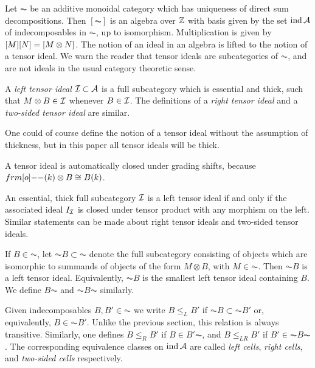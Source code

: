 Let $\AC$ be an additive monoidal category which has uniqueness of direct sum decompositions. Then $[\AC]$ is an algebra over ${\mathbb{Z}}$ with basis given by the set $\operatorname{ind} {\mathcal{A}}$ of indecomposables in $\AC$, up to isomorphism. Multiplication is given by $[M][N] = [M \otimes N]$. The notion of an ideal in an algebra is lifted to the notion of a tensor ideal.  We warn the reader that tensor ideals are subcategories of $\AC$, and are not ideals in the usual category theoretic sense.%

\begin{defn} A \emph{left tensor ideal} ${\mathcal{I}} \subset {\mathcal{A}}$ is a full subcategory which is essential and thick, such that $M \otimes B \in {\mathcal{I}}$ whenever $B \in {\mathcal{I}}$. The definitions of a \emph{right tensor ideal} and a \emph{two-sided tensor ideal} are similar. \end{defn}

One could of course define the notion of a tensor ideal without the assumption of thickness, but in this paper all tensor ideals will be thick.

\begin{remark}
A tensor ideal is automatically closed under grading shifts, because $\one(k) \ot B \cong B(k)$.
\end{remark}

\begin{remark} An essential, thick full subcategory ${\mathcal{I}}$ is a left tensor ideal if and only if the associated ideal $I_{{\mathcal{I}}}$ is closed under tensor product with any morphism on the left. Similar statements can be made about right tensor ideals and two-sided tensor ideals.  \end{remark}

If $B\in \AC$, let $\AC B \subset \AC$ denote the full subcategory consisting of objects which are isomorphic to summands of objects of the form $M\otimes B$, with $M \in \AC$. Then $\AC B$ is a left tensor ideal. Equivalently, $\AC B$ is the smallest left tensor ideal containing $B$. We define $B\AC$ and $\AC B \AC$ similarly.

Given indecomposables $B,B'\in \AC$ we write $B \le_L B'$ if $\AC B \subset \AC B'$ or, equivalently, $B\in \AC B'$.  Unlike the previous section, this relation is always transitive.  Similarly, one defines $B \le_R B'$ if $B \in B' \AC$, and $B \le_{LR} B'$ if $B'\in \AC B\AC$.  The corresponding equivalence classes on $\operatorname{ind} {\mathcal{A}}$ are called \emph{left cells}, \emph{right cells}, and \emph{two-sided cells} respectively.


